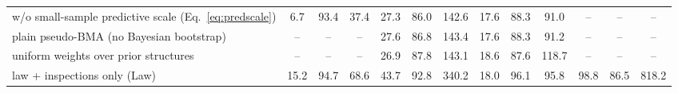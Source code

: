 \begin{table}[!tbp]
\begin{tabular}{lcccccccccccc}
w/o small-sample predictive scale (Eq.~\eqref{eq:predscale}) & 6.7 & 93.4 & 37.4 & 27.3 & 86.0 & 142.6 & 17.6 & 88.3 & 91.0 & -- & -- & --\\
plain pseudo-BMA (no Bayesian bootstrap) & -- & -- & -- & 27.6 & 86.8 & 143.4 & 17.6 & 88.3 & 91.2 & -- & -- & --\\
uniform weights over prior structures & -- & -- & -- & 26.9 & 87.8 & 143.1 & 18.6 & 87.6 & 118.7 & -- & -- & --\\
law + inspections only (Law) & 15.2 & 94.7 & 68.6 & 43.7 & 92.8 & 340.2 & 18.0 & 96.1 & 95.8 & 98.8 & 86.5 & 818.2\\
\bottomrule
\end{tabular}
\end{table}